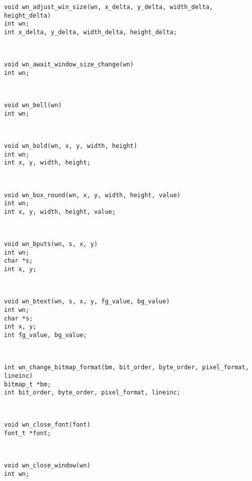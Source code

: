 %
\parbox[t]{5in}{\tt void wn\_adjust\_win\_size(wn, x\_delta, y\_delta, width\_delta, height\_delta)\\int wn;\\int x\_delta, y\_delta, width\_delta, height\_delta;}\> \pageref{wn_adjust_win_size}\\[0.1in]
\parbox[t]{5in}{\tt void wn\_await\_window\_size\_change(wn)\\int wn;}\> \pageref{wn_await_window_size_change}\\[0.1in]
\parbox[t]{5in}{\tt void wn\_bell(wn)\\int wn;}\> \pageref{wn_bell}\\[0.1in]
\parbox[t]{5in}{\tt void wn\_bold(wn, x, y, width, height)\\int wn;\\int x, y, width, height;}\> \pageref{wn_bold}\\[0.1in]
\parbox[t]{5in}{\tt void wn\_box\_round(wn, x, y, width, height, value)\\int wn;\\int x, y, width, height, value;}\> \pageref{wn_box_round}\\[0.1in]
\parbox[t]{5in}{\tt void wn\_bputs(wn, s, x, y)\\int wn;\\char *s;\\int x, y;}\> \pageref{wn_bputs}\\[0.1in]
\parbox[t]{5in}{\tt void wn\_btext(wn, s, x, y, fg\_value, bg\_value)\\int wn;\\char *s;\\int x, y;\\int fg\_value, bg\_value;}\> \pageref{wn_btext}\\[0.1in]
\parbox[t]{5in}{\tt int wn\_change\_bitmap\_format(bm, bit\_order, byte\_order, pixel\_format, lineinc)\\bitmap\_t *bm;\\int bit\_order, byte\_order, pixel\_format, lineinc;}\> \pageref{wn_change_bitmap_format}\\[0.1in]
\parbox[t]{5in}{\tt void wn\_close\_font(font)\\font\_t *font;}\> \pageref{wn_close_font}\\[0.1in]
\parbox[t]{5in}{\tt void wn\_close\_window(wn)\\int wn;}\> \pageref{wn_close_window}\\[0.1in]
